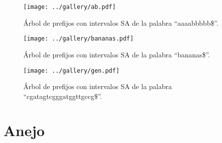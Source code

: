 \documentclass{article}
\newcommand{\C}{C }
\newcommand{\R}{R }
\newcommand{\python}{Python }
\begin{document}
\clearpage
\phantom{}
\vfill
\begin{figure}[h!]
\centering
\texttt{[image: ../gallery/ab.pdf]}
\caption{Árbol de prefijos con intervalos SA de la palabra ``aaaabbbbb\$''.}
\label{fig:arbol2}
\end{figure}
\vfill

\clearpage

\phantom{}
\vspace{3cm}
\begin{figure}[h]
\centering
\texttt{[image: ../gallery/bananas.pdf]}
\caption{Árbol de prefijos con intervalos SA de la palabra ``bananas\$''.}
\label{fig:arbol3}
\end{figure}

\begin{figure}[h]
\centering
\texttt{[image: ../gallery/gen.pdf]}
\caption{Árbol de prefijos con intervalos SA de la palabra ``cgatagtcgggatggttgccg\$''.}
\label{fig:arbol4}
\end{figure}
\clearpage
\section{Anejo}








\vfill



\end{document}
